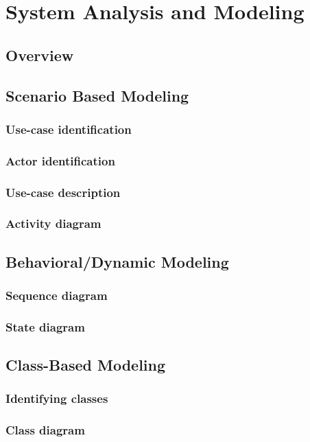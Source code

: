 \chapter{System Analysis and Modeling}
\section{Overview}

\section{Scenario Based Modeling}
	\subsection{Use-case identification}
	\subsection{Actor identification}
	\subsection{Use-case description}
	\subsection{Activity diagram}

\section{Behavioral/Dynamic Modeling}
	\subsection{Sequence diagram}
	\subsection{State diagram}

\section{Class-Based Modeling}
	\subsection{Identifying classes}
	\subsection{Class diagram}